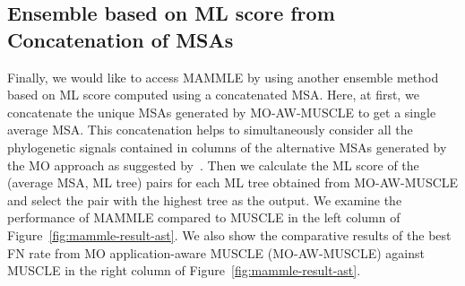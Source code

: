 
\subsection{Ensemble based on ML score from Concatenation of MSAs}
Finally, we would like to access MAMMLE by using another ensemble method based on ML score computed using a concatenated MSA. Here, at first, we concatenate the unique MSAs generated by MO-AW-MUSCLE to get a single average MSA. This concatenation helps to simultaneously consider all the phylogenetic signals contained in columns of the alternative MSAs generated by the MO approach as suggested by~\cite{ashkenazy2018multiple}.
Then we calculate the ML score of the (average MSA, ML tree) pairs for each ML tree obtained from MO-AW-MUSCLE and select the pair with the highest tree as the output. We examine the performance of MAMMLE compared to MUSCLE in the left column of Figure~\ref{fig:mammle-result-ast}. We also show the comparative results of the best FN rate from MO application-aware MUSCLE (MO-AW-MUSCLE) against MUSCLE in the right column of Figure~\ref{fig:mammle-result-ast}.

